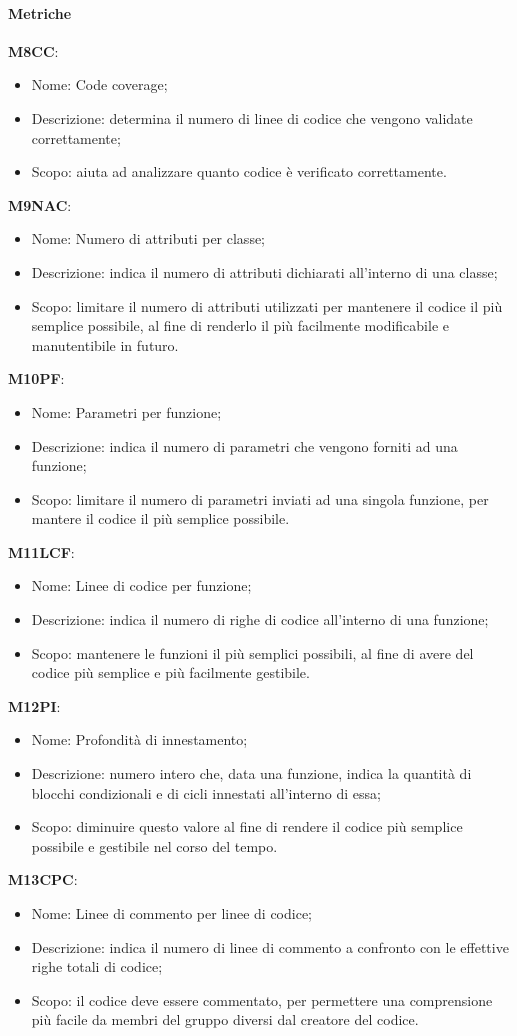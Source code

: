 \paragraph{Metriche}\hfill \break
\textbf{M8CC}:
\begin{itemize}
  \item Nome: Code coverage;
  \item Descrizione: determina il numero di linee di codice che vengono validate correttamente;
  \item Scopo: aiuta ad analizzare quanto codice è verificato correttamente.
\end{itemize}
\textbf{M9NAC}:
\begin{itemize}
  \item Nome: Numero di attributi per classe;
  \item Descrizione: indica il numero di attributi dichiarati all'interno di una classe;
  \item Scopo: limitare il numero di attributi utilizzati per mantenere il codice il più semplice possibile, al fine di renderlo il più facilmente modificabile e manutentibile in futuro.
\end{itemize}
\textbf{M10PF}:
\begin{itemize}
  \item Nome: Parametri per funzione;
  \item Descrizione: indica il numero di parametri che vengono forniti ad una funzione;
  \item Scopo: limitare il numero di parametri inviati ad una singola funzione, per mantere il codice il più semplice possibile.
\end{itemize}
\textbf{M11LCF}:
\begin{itemize}
  \item Nome: Linee di codice per funzione;
  \item Descrizione: indica il numero di righe di codice all'interno di una funzione;
  \item Scopo: mantenere le funzioni il più semplici possibili, al fine di avere del codice più semplice e più facilmente gestibile.
\end{itemize}    
\textbf{M12PI}:
\begin{itemize}
  \item Nome: Profondità di innestamento;
  \item Descrizione: numero intero che, data una funzione, indica la quantità di blocchi condizionali e di cicli innestati all'interno di essa;
  \item Scopo: diminuire questo valore al fine di rendere il codice più semplice possibile e gestibile nel corso del tempo.
\end{itemize}
\textbf{M13CPC}:
\begin{itemize}
  \item Nome: Linee di commento per linee di codice;
  \item Descrizione: indica il numero di linee di commento a confronto con le effettive righe totali di codice;
  \item Scopo: il codice deve essere commentato, per permettere una comprensione più facile da membri del gruppo diversi dal creatore del codice.
\end{itemize}